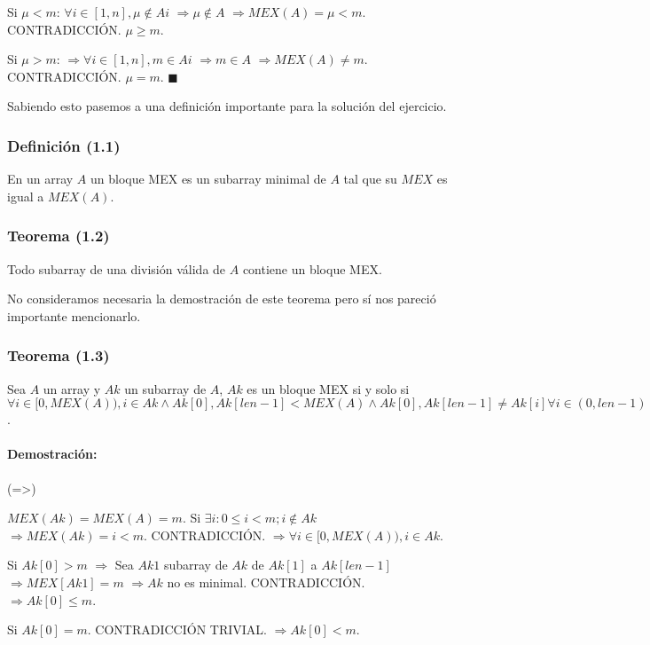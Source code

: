\documentclass{article}
\begin{document}
Si $\mu < m$: $\forall i \in [1,n], \mu \notin Ai$ $\Rightarrow \mu \notin A$ $\Rightarrow MEX(A) = \mu < m$. CONTRADICCIÓN. $\mu \geq m$.

Si $\mu > m$: $\Rightarrow \forall i \in [1,n], m \in Ai$ $\Rightarrow m \in A$ $\Rightarrow MEX(A) \neq m$. CONTRADICCIÓN. $\mu = m$. $\blacksquare$

Sabiendo esto pasemos a una definición importante para la solución del ejercicio.

\subsubsection*{Definición (1.1)}

En un array $A$ un bloque MEX es un subarray minimal de $A$ tal que su $MEX$ es igual a $MEX(A)$.

\subsubsection*{Teorema (1.2)}

Todo subarray de una división válida de $A$ contiene un bloque MEX.

No consideramos necesaria la demostración de este teorema pero sí nos pareció importante mencionarlo.

\subsubsection*{Teorema (1.3)}

Sea $A$ un array y $Ak$ un subarray de $A$, $Ak$ es un bloque MEX si y solo si $\forall i \in [0,MEX(A)), i \in Ak \land Ak[0], Ak[len -1] < MEX(A) \land Ak[0],Ak[len -1] \neq Ak[i] \forall i \in (0, len-1)$.

\paragraph*{Demostración:}

(=>)

$MEX(Ak) = MEX(A) = m$. Si $\exists i: 0 \leq i < m; i \notin Ak$ $\Rightarrow MEX(Ak) = i < m$. CONTRADICCIÓN. $\Rightarrow \forall i \in [0,MEX(A)), i \in Ak$.

Si $Ak[0] > m$ $\Rightarrow$ Sea $Ak1$ subarray de $Ak$ de $Ak[1]$ a $Ak[len -1]$ $\Rightarrow MEX[Ak1] = m$ $\Rightarrow Ak$ no es minimal. CONTRADICCIÓN. $\Rightarrow Ak[0] \leq m$.

Si $Ak[0] = m$. CONTRADICCIÓN TRIVIAL. $\Rightarrow Ak[0] < m$.
\end{document}
